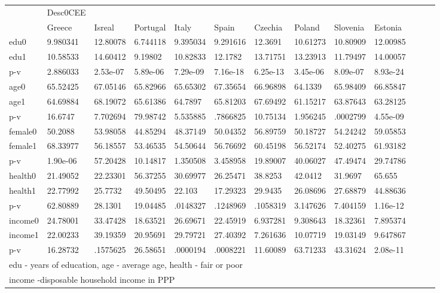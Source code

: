 \begin{tabular}{lllllllllllll} \hline\hline
            &    Desc0CEE&            &            &            &            &            &            &            &            \\
            &      Greece&      Isreal&    Portugal&       Italy&       Spain&     Czechia&      Poland&    Slovenia&     Estonia\\
\hline
edu0        &    9.980341&    12.80078&    6.744118&    9.395034&    9.291616&     12.3691&    10.61273&    10.80909&    12.00985\\
edu1        &    10.58533&    14.60412&     9.19802&    10.82833&     12.1782&    13.71751&    13.23913&    11.79497&    14.00057\\
p-v         &    2.886033&    2.53e-07&    5.89e-06&    7.29e-09&    7.16e-18&    6.25e-13&    3.45e-06&    8.09e-07&    8.93e-24\\
age0        &    65.52425&    67.05146&    65.82966&    65.65302&    67.35654&    66.96898&     64.1339&    65.98409&    66.85847\\
age1        &    64.69884&    68.19072&    65.61386&     64.7897&    65.81203&    67.69492&    61.15217&    63.87643&    63.28125\\
p-v         &     16.6747&    7.702694&    79.98742&    5.535885&    .7866825&    10.75134&    1.956245&    .0002799&    4.55e-09\\
female0     &     50.2088&    53.98058&    44.85294&    48.37149&    50.04352&    56.89759&    50.18727&    54.24242&    59.05853\\
female1     &    68.33977&    56.18557&    53.46535&    54.50644&    56.76692&    60.45198&    56.52174&    52.40275&    61.93182\\
p-v         &    1.90e-06&    57.20428&    10.14817&    1.350508&    3.458958&    19.89007&    40.06027&    47.49474&    29.74786\\
health0     &    21.49052&    22.23301&    56.37255&    30.69977&    26.25471&     38.8253&     42.0412&     31.9697&      65.655\\
health1     &    22.77992&     25.7732&    49.50495&      22.103&    17.29323&     29.9435&    26.08696&    27.68879&    44.88636\\
p-v         &    62.80889&     28.1301&    19.04485&    .0148327&    .1248969&    .1058319&    3.147626&    7.404159&    1.16e-12\\
income0     &    24.78001&    33.47428&    18.63521&    26.69671&    22.45919&    6.937281&    9.308643&    18.32361&    7.895374\\
income1     &    22.00233&    39.19359&    20.95691&    29.79721&    27.40392&    7.261636&    10.07719&    19.03149&    9.647867\\
p-v         &    16.28732&    .1575625&    26.58651&    .0000194&    .0008221&    11.60089&    63.71233&    43.31624&    2.08e-11\\
\hline\hline
\multicolumn{10}{l}{\footnotesize edu - years of education, age - average age, health - fair or poor}\\
\multicolumn{10}{l}{\footnotesize income -disposable household income in PPP}\\
\end{tabular}
